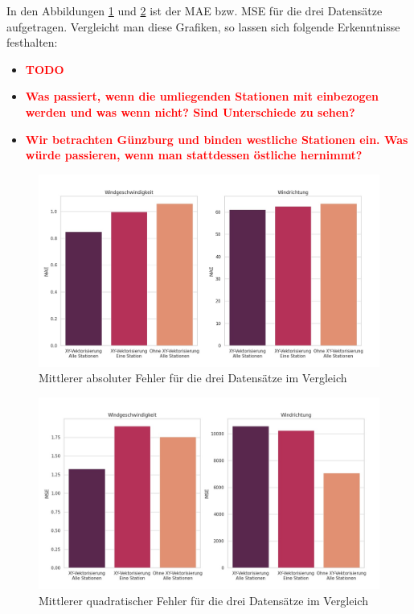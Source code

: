 \documentclass[
12pt, %
toc=listofnumbered, %
toc=chapterentrydotfill, %
numbers=noenddot, %
captions=tableheading, %
bibliography=numbered
]{scrreprt}
\newcommand{\highlight}[1]{\textbf{\textcolor{red}{#1}}}
\begin{document}
In den Abbildungen \ref{fig:barplot_mae} und \ref{fig:barplot_mse} ist der MAE bzw. MSE für die drei Datensätze aufgetragen. Vergleicht man diese Grafiken, so lassen sich folgende Erkenntnisse festhalten:

\begin{itemize}
	\item \highlight{TODO}
	\item \highlight{Was passiert, wenn die umliegenden Stationen mit einbezogen werden und was wenn nicht? Sind Unterschiede zu sehen?}

	\item\highlight{Wir betrachten Günzburg und binden westliche Stationen ein. Was würde passieren, wenn man stattdessen östliche hernimmt?}
\end{itemize}

\begin{figure}[tph]
	\begin{center}
		\includegraphics[width=\linewidth]{./images/barplot_mae-cropped.jpg}
		\caption{Mittlerer absoluter Fehler für die drei Datensätze im Vergleich}
		\label{fig:barplot_mae}
	\end{center}
\end{figure}

\begin{figure}[tph]
	\begin{center}
		\includegraphics[width=\linewidth]{./images/barplot_mse-cropped.jpg}
		\caption{Mittlerer quadratischer Fehler für die drei Datensätze im Vergleich}
		\label{fig:barplot_mse}
	\end{center}
\end{figure}
\end{document}
